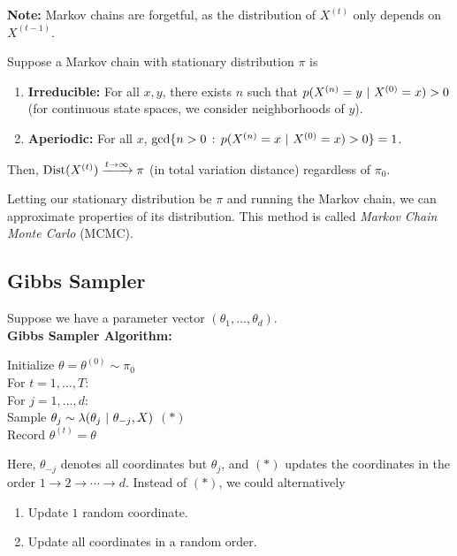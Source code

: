 \textbf{Note:} Markov chains are forgetful, as the distribution of $X^{(t)}$ only depends on $X^{(t - 1)}$.

\begin{theorem}
    Suppose a Markov chain with stationary distribution $\pi$ is
    \begin{enumerate}
        \item \textbf{Irreducible:} For all $x, y$, there exists $n$ such that $p(X^{(n)} = y \given X^{(0)} = x) > 0$ (for continuous state spaces, we consider neighborhoods of $y$).
        \item \textbf{Aperiodic:} For all $x$, $\gcd\{n > 0 \col p(X^{(n)} = x \given X^{(0)} = x) > 0\} = 1$.
    \end{enumerate}
    Then, $\tt{Dist}(X^{(t)}) \xrightarrow{t \to \infty} \pi$ (in total variation distance) regardless of $\pi_0$.
\end{theorem}

Letting our stationary distribution be $\pi$ and running the Markov chain, we can approximate properties of its distribution. This method is called \emph{Markov Chain Monte Carlo} (MCMC).

\subsection*{Gibbs Sampler}
\sectionspace

Suppose we have a parameter vector $(\theta_1, \ldots, \theta_d)$.\\

\textbf{Gibbs Sampler Algorithm:}
\begin{center}
    \begin{minipage}{0.6\linewidth}
        Initialize $\theta = \theta^{(0)} \sim \pi_0$\\
        For $t = 1, \ldots, T$:\\
        \hspace*{0.6cm}For $j = 1, \ldots, d$:\\
        \hspace*{1.2cm}Sample $\theta_j \sim \lambda(\theta_j \given \theta_{-j}, X)$ \hfill $(*)$\\
        \hspace*{0.6cm}Record $\theta^{(t)} = \theta$
    \end{minipage}
\end{center}
Here, $\theta_{-j}$ denotes all coordinates but $\theta_j$, and $(*)$ updates the coordinates in the order $1 \to 2 \to \cdots \to d$. Instead of $(*)$, we could alternatively
\begin{enumerate}[label = \alph*)]
    \item Update $1$ random coordinate.
    \item Update all coordinates in a random order.
\end{enumerate}



